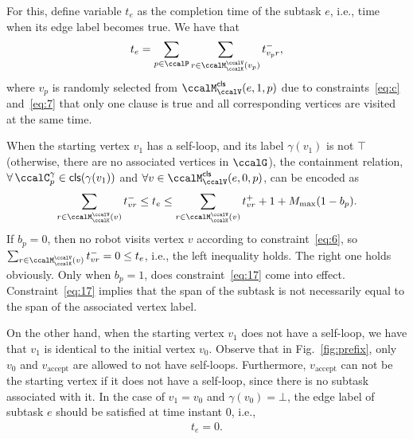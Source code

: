 \documentclass[Afour,sageh,times]{sagej}
\newcommand{\clause}[1]{\mathsf{cls}(#1)}
\newcommand{\vertex}[1]{v_{\text{#1}}}
\begin{document}
{{{For this, define variable  $t_e$ as the completion time of the subtask $e$, i.e., time when its edge label  becomes true. We have  that
\begingroup\makeatletter\def\f@size{10}\check@mathfonts
\def\maketag@@@#1{\hbox{\m@th\normalsize\normalfont#1}}%
\begin{align}\label{eq:edgetime}
  t_e = \sum_{p\in \ccalP} \sum_{r\in \ccalM^\ccalV_{\ccalK}(v_p)}t_{v_p r}^-,
\end{align}
\endgroup
where $v_p$ is randomly selected from $\ccalM^\mathsf{cls}_\ccalV(e,1,p)$ due to constraints~\eqref{eq:c} and~\eqref{eq:7} that only one clause is true and all corresponding vertices are visited at the same time.

When the starting vertex $v_1$ has a self-loop, and its label $\gamma(v_1)$ is not  $\top$ (otherwise, there are no associated vertices in $\ccalG$), the containment relation, $\forall\, \ccalC_p^{\gamma} \in \clause{\gamma(v_1)}$ and $\forall v \in \ccalM^\mathsf{cls}_\ccalV(e,0,p)$, can be encoded as
\begingroup\makeatletter\def\f@size{10}\check@mathfonts
\def\maketag@@@#1{\hbox{\m@th\normalsize\normalfont#1}}%
  \begin{align}
 \sum_{r\in \ccalM^\ccalV_{\ccalK}(v)} t_{vr}^-  \leq  t_e \leq
    \sum_{r\in \ccalM^\ccalV_{\ccalK}(v)} t_{vr}^+ + 1  + M_{\text{max}} (1 - b_{p}). \label{eq:17}
  \end{align}
  \endgroup
  If $b_p=0$, then no robot visits vertex $v$ according to constraint~\eqref{eq:6}, so~ $ \sum_{r\in \ccalM^\ccalV_{\ccalK}(v)} t_{vr}^- = 0 \leq t_e$, i.e., the left inequality holds. The right one holds obviously. Only when $b_p=1$, does constraint~\eqref{eq:17} come into effect. Constraint~\eqref{eq:17} implies that the span of the subtask is not necessarily equal to the span of the associated vertex label.

  On the other hand, when the starting vertex $v_1$ does not have a self-loop, we have that $v_1$ is identical to the initial vertex $v_0$. Observe that in Fig.~\ref{fig:prefix}, only $v_0$ and $\vertex{accept}$ are allowed to not have self-loops. Furthermore, $\vertex{accept}$ can not be the starting vertex if it does not have a self-loop, since there is no subtask associated with it. In the case of $v_1 = v_0$ and $\gamma(v_0) = \bot$, the edge label of subtask $e$ should be satisfied at time instant 0, i.e.,
  \begingroup\makeatletter\def\f@size{10}\check@mathfonts
\def\maketag@@@#1{\hbox{\m@th\normalsize\normalfont#1}}%
  \begin{align}
 t_e = 0. \label{eq:tis0}
  \end{align}
  \endgroup


}}}
\end{document}

